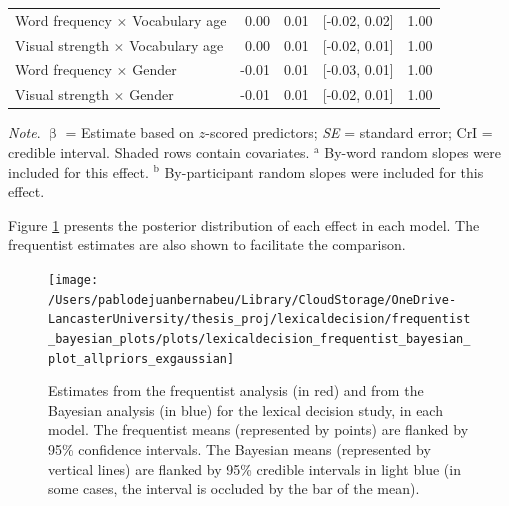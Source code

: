 \documentclass[
  12pt,
  man,floatsintext]{apa7}
\begin{document}
\begin{table}[!h]
\begin{threeparttable}
\begin{tabular}[t]{lrrrr}
\hspace{1em}Word frequency  $\times$  Vocabulary age & 0.00 & 0.01 & {}[-0.02, 0.02] & 1.00\\
\hspace{1em}Visual strength  $\times$  Vocabulary age & 0.00 & 0.01 & {}[-0.02, 0.01] & 1.00\\
\hspace{1em}Word frequency  $\times$  Gender & -0.01 & 0.01 & {}[-0.03, 0.01] & 1.00\\
\hspace{1em}Visual strength  $\times$  Gender & -0.01 & 0.01 & {}[-0.02, 0.01] & 1.00\\
\bottomrule
\end{tabular}
\begin{tablenotes}
\item \textit{\linebreak} 
\item \textit{Note}. $\upbeta$ = Estimate based on $z$-scored predictors; \textit{SE} = standard error; \linebreak \phantom{.}CrI = credible interval. Shaded rows contain covariates. \linebreak \linebreak \phantom{.}$^{\text{a}}$ By-word random slopes were included for this effect. \linebreak \phantom{.}$^{\text{b}}$ By-participant random slopes were included for this effect.
\end{tablenotes}
\end{threeparttable}
\end{table}

\clearpage

Figure \ref{fig:lexicaldecision-frequentist-bayesian-plot-allpriors-exgaussian} presents the posterior distribution of each effect in each model. The frequentist estimates are also shown to facilitate the comparison.

\begin{figure}

{\centering \texttt{[image: /Users/pablodejuanbernabeu/Library/CloudStorage/OneDrive-LancasterUniversity/thesis\_proj/lexicaldecision/frequentist\_bayesian\_plots/plots/lexicaldecision\_frequentist\_bayesian\_plot\_allpriors\_exgaussian]} 

}

\caption{Estimates from the frequentist analysis (in red) and from the Bayesian analysis (in blue) for the lexical decision study, in each model. The frequentist means (represented by points) are flanked by 95\% confidence intervals. The Bayesian means (represented by vertical lines) are flanked by 95\% credible intervals in light blue (in some cases, the interval is occluded by the bar of the mean).}\label{fig:lexicaldecision-frequentist-bayesian-plot-allpriors-exgaussian}
\end{figure}
\end{document}
